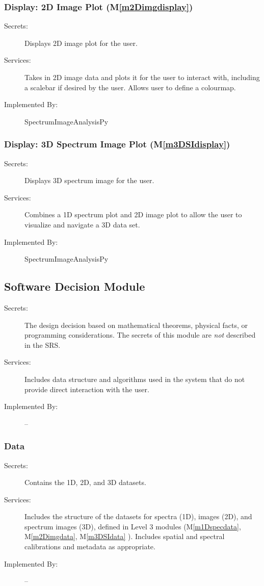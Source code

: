 \documentclass[12pt, titlepage]{article}
\newcommand{\mref}[1]{M\ref{#1}}
\newcommand{\progname}{SpectrumImageAnalysisPy}
\begin{document}
\subsubsection{Display: 2D Image Plot (\mref{m2Dimgdisplay})}
\begin{description}
	\item[Secrets:]Displays 2D image plot for the user.
	\item[Services:]Takes in 2D image data and plots it for the user to interact
with, including a scalebar if desired by the user. Allows user to define a
colourmap. 
	\item[Implemented By:] \progname
\end{description}

\subsubsection{Display: 3D Spectrum Image Plot (\mref{m3DSIdisplay})}
\begin{description}
	\item[Secrets:]Displays 3D spectrum image for the user.
	\item[Services:]Combines a 1D spectrum plot and 2D image plot to allow the user
to visualize and navigate a 3D data set. 
	\item[Implemented By:] \progname
\end{description}

\subsection{Software Decision Module}

\begin{description}
\item[Secrets:] The design decision based on mathematical theorems, physical
  facts, or programming considerations. The secrets of this module are
  \emph{not} described in the SRS.
\item[Services:] Includes data structure and algorithms used in the system that
  do not provide direct interaction with the user. 
\item[Implemented By:] --
\end{description}

\subsubsection{Data}
\begin{description}
	\item[Secrets:]Contains the 1D, 2D, and 3D datasets.
	\item[Services:]Includes the structure of the datasets for spectra (1D), images
(2D), and spectrum images (3D), defined in Level 3 modules (\mref{m1Dspecdata},
\mref{m2Dimgdata}, \mref{m3DSIdata} ). Includes spatial and spectral
calibrations and metadata as appropriate.
	\item[Implemented By:] --
\end{description}
\end{document}

